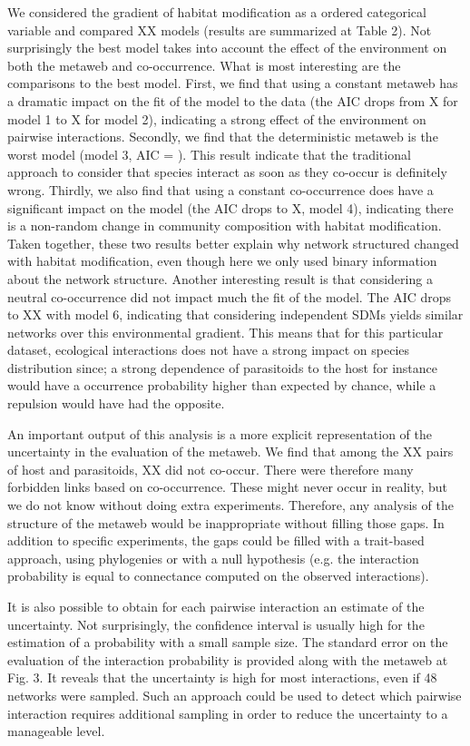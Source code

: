 We considered the gradient of habitat modification as a ordered categorical
variable and compared XX models (results are summarized at Table 2). Not
surprisingly the best model takes into account the effect of the environment on
both the metaweb and co-occurrence. What is most interesting are the comparisons
to the best model. First, we find that using a constant metaweb has a dramatic
impact on the fit of the model to the data (the AIC drops from X for model 1 to
X for model 2), indicating a strong effect of the environment on pairwise
interactions. Secondly, we find that the deterministic metaweb is the worst
model (model 3, AIC = ). This result indicate that the traditional approach to
consider that species interact as soon as they co-occur is definitely wrong.
Thirdly, we also find that using a constant co-occurrence does have a
significant impact on the model (the AIC drops to X, model 4), indicating there
is a non-random change in community composition with habitat modification. Taken
together, these two results better explain why network structured changed with
habitat modification, even though here we only used binary information about the
network structure. Another interesting result is that considering a neutral
co-occurrence did not impact much the fit of the model. The AIC drops to XX
with model 6, indicating that considering independent SDMs yields similar
networks over this environmental gradient. This means that for this particular
dataset, ecological interactions does not have a strong impact on species
distribution since; a strong dependence of parasitoids to the host for instance
would have a occurrence probability higher than expected by chance, while a
repulsion would have had the opposite.

An important output of this analysis is a more explicit representation of the
uncertainty in the evaluation of the metaweb. We find that among the XX pairs of
host and parasitoids, XX did not co-occur. There were therefore many forbidden
links based on co-occurrence. These might never occur in reality, but we do not
know without doing extra experiments. Therefore, any analysis of the structure
of the metaweb would be inappropriate without filling those gaps. In addition to
specific experiments, the gaps could be filled with a trait-based approach,
using phylogenies or with a null hypothesis (e.g. the interaction probability is
equal to connectance computed on the observed interactions).

It is also possible to obtain for each pairwise interaction an estimate of
the uncertainty. Not surprisingly, the confidence interval is usually high
for the estimation of a probability with a small sample size. The standard
error on the evaluation of the interaction probability is provided along
with the metaweb at Fig. 3. It reveals that the uncertainty is high for
most interactions, even if 48 networks were sampled. Such an approach could
be used to detect which pairwise interaction requires additional sampling
in order to reduce the uncertainty to a manageable level.